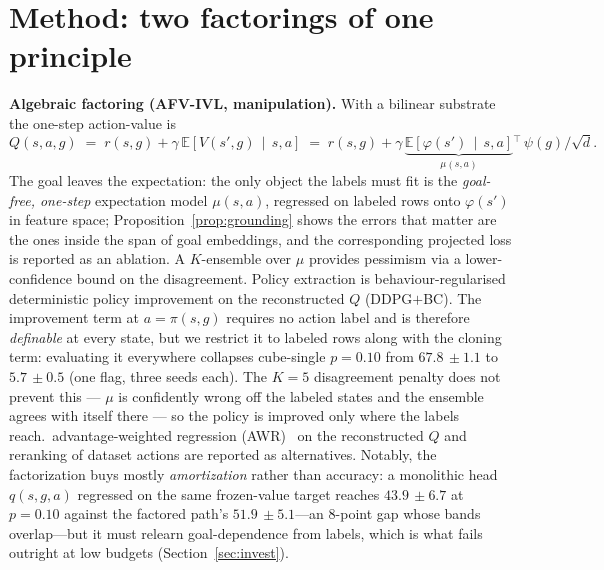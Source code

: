 \documentclass{article}
\newcommand{\E}{\mathbb{E}}
\newcommand{\pmm}[2]{#1{\scriptstyle\,\pm #2}}
\theoremstyle{plain}
\theoremstyle{definition}
\begin{document}
\section{Method: two factorings of one principle}
\label{sec:method}
\textbf{Algebraic factoring (AFV-IVL, manipulation).}
With a bilinear substrate the one-step action-value is
\begin{equation}
Q(s,a,g) \;=\; r(s,g) + \gamma\,\E\!\left[V(s',g)\,\middle|\,s,a\right]
\;=\; r(s,g) + \gamma\,\underbrace{\E\!\left[\varphi(s')\,\middle|\,s,a\right]}_{\textstyle \mu(s,a)}{}^{\!\top}\,\psi(g)/\sqrt{d}.
\label{eq:factor}
\end{equation}
The goal leaves the expectation: the only object the labels must fit is the \emph{goal-free, one-step} expectation model $\mu(s,a)$, regressed on labeled rows onto $\varphi(s')$ in feature space; Proposition~\ref{prop:grounding} shows the errors that matter are the ones inside the span of goal embeddings, and the corresponding projected loss is reported as an ablation. A $K$-ensemble over $\mu$ provides pessimism via a lower-confidence bound on the disagreement. Policy extraction is behaviour-regularised deterministic policy improvement on the reconstructed $Q$ (DDPG${+}$BC). The improvement term at $a=\pi(s,g)$ requires no action label and is therefore \emph{definable} at every state, but we restrict it to labeled rows along with the cloning term: evaluating it everywhere collapses cube-single $p{=}0.10$ from $\pmm{67.8}{1.1}$ to $\pmm{5.7}{0.5}$ (one flag, three seeds each). The $K{=}5$ disagreement penalty does not prevent this --- $\mu$ is confidently wrong off the labeled states and the ensemble agrees with itself there --- so the policy is improved only where the labels reach.\  advantage-weighted regression (AWR)~\citep{awr} on the reconstructed $Q$ and reranking of dataset actions are reported as alternatives. Notably, the factorization buys mostly \emph{amortization} rather than accuracy: a monolithic head $q(s,g,a)$ regressed on the same frozen-value target reaches $\pmm{43.9}{6.7}$ at $p{=}0.10$ against the factored path's $\pmm{51.9}{5.1}$---an $8$-point gap whose bands overlap---but it must relearn goal-dependence from labels, which is what fails outright at low budgets (Section~\ref{sec:invest}).
\end{document}
